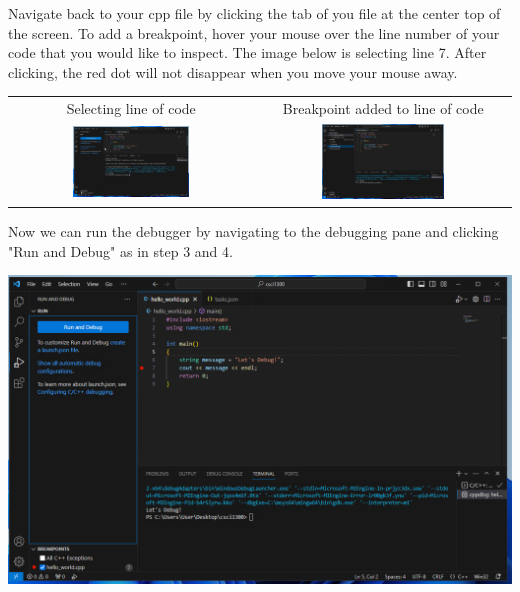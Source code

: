 Navigate back to your cpp file by clicking the tab of you file at the center top of the screen. To add a breakpoint, hover your mouse over the line number of your code that you would like to inspect. The image below is selecting line 7. After clicking, the red dot will not disappear when you move your mouse away.

\begin{table}[H]
    \centering
    \begin{tabular}{c|c}
        Selecting line of code & Breakpoint added to line of code \\
        \includegraphics[width=0.5\textwidth]{images/windowsDebuggerSetup/debugger_windows_13.png} & \includegraphics[width=0.5\textwidth]{images/windowsDebuggerSetup/debugger_windows_14.png}
    \end{tabular}
\end{table}

Now we can run the debugger by navigating to the debugging pane and clicking "Run and Debug" as in step 3 and 4. 

\includegraphics[width=\textwidth]{images/windowsDebuggerSetup/debugger_windows_15.png}

